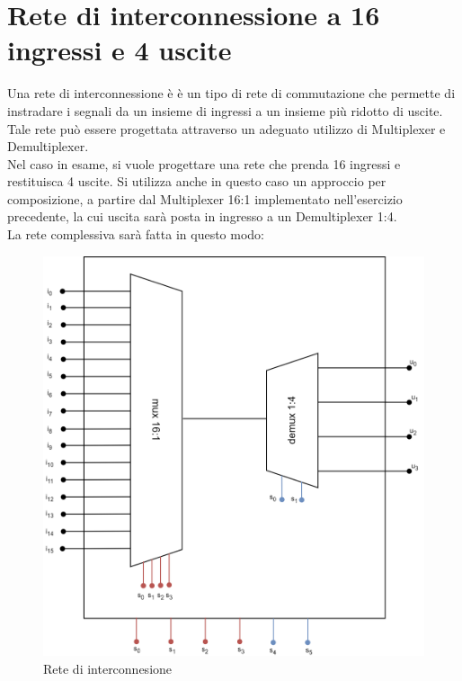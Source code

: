 \section{Rete di interconnessione a 16 ingressi e 4 uscite}
Una rete di interconnessione è è un tipo di rete di commutazione che permette di instradare i segnali da un insieme di ingressi a un insieme più ridotto di uscite. Tale rete può essere progettata attraverso un adeguato utilizzo di Multiplexer e Demultiplexer. \\
Nel caso in esame, si vuole progettare una rete che prenda 16 ingressi e restituisca 4 uscite. Si utilizza anche in questo caso un approccio per composizione, a partire dal Multiplexer 16:1 implementato nell'esercizio precedente, la cui uscita sarà posta in ingresso a un Demultiplexer 1:4.\\
La rete complessiva sarà fatta in questo modo:
 \begin{figure}[H]
	\centering
	\includegraphics[width=1\textwidth]{img/Rete_interconn}
	\caption{Rete di interconnesione}
	\label{Demux 1:2} 
\end{figure}


